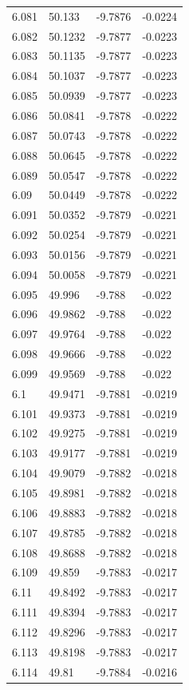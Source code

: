 \begin{tabular}{llll}
6.081 & 50.133 & -9.7876 & -0.0224 \\
6.082 & 50.1232 & -9.7877 & -0.0223 \\
6.083 & 50.1135 & -9.7877 & -0.0223 \\
6.084 & 50.1037 & -9.7877 & -0.0223 \\
6.085 & 50.0939 & -9.7877 & -0.0223 \\
6.086 & 50.0841 & -9.7878 & -0.0222 \\
6.087 & 50.0743 & -9.7878 & -0.0222 \\
6.088 & 50.0645 & -9.7878 & -0.0222 \\
6.089 & 50.0547 & -9.7878 & -0.0222 \\
6.09 & 50.0449 & -9.7878 & -0.0222 \\
6.091 & 50.0352 & -9.7879 & -0.0221 \\
6.092 & 50.0254 & -9.7879 & -0.0221 \\
6.093 & 50.0156 & -9.7879 & -0.0221 \\
6.094 & 50.0058 & -9.7879 & -0.0221 \\
6.095 & 49.996 & -9.788 & -0.022 \\
6.096 & 49.9862 & -9.788 & -0.022 \\
6.097 & 49.9764 & -9.788 & -0.022 \\
6.098 & 49.9666 & -9.788 & -0.022 \\
6.099 & 49.9569 & -9.788 & -0.022 \\
6.1 & 49.9471 & -9.7881 & -0.0219 \\
6.101 & 49.9373 & -9.7881 & -0.0219 \\
6.102 & 49.9275 & -9.7881 & -0.0219 \\
6.103 & 49.9177 & -9.7881 & -0.0219 \\
6.104 & 49.9079 & -9.7882 & -0.0218 \\
6.105 & 49.8981 & -9.7882 & -0.0218 \\
6.106 & 49.8883 & -9.7882 & -0.0218 \\
6.107 & 49.8785 & -9.7882 & -0.0218 \\
6.108 & 49.8688 & -9.7882 & -0.0218 \\
6.109 & 49.859 & -9.7883 & -0.0217 \\
6.11 & 49.8492 & -9.7883 & -0.0217 \\
6.111 & 49.8394 & -9.7883 & -0.0217 \\
6.112 & 49.8296 & -9.7883 & -0.0217 \\
6.113 & 49.8198 & -9.7883 & -0.0217 \\
6.114 & 49.81 & -9.7884 & -0.0216 \\

\end{tabular}
